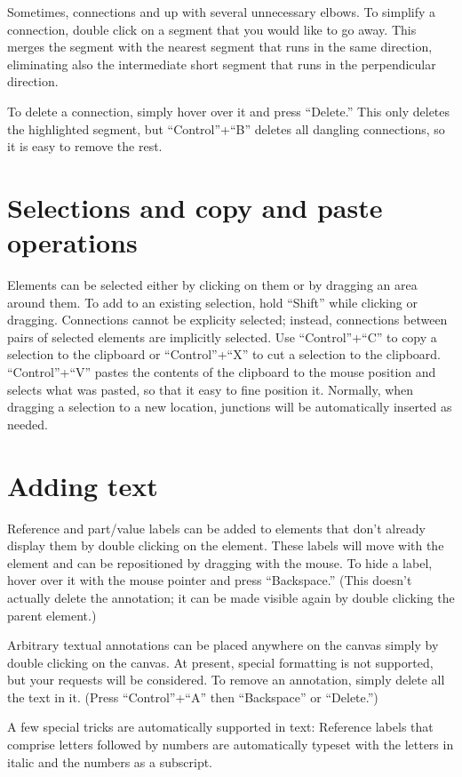 \documentclass[11pt]{report}
\begin{document}
Sometimes, connections and up with several unnecessary elbows. To
simplify a connection, double click on a segment that you would like
to go away. This merges the segment with the nearest segment that runs
in the same direction, eliminating also the intermediate short segment
that runs in the perpendicular direction.

To delete a connection, simply hover over it and press ``Delete.''
This only deletes the highlighted segment, but ``Control''+``B''
deletes all dangling connections, so it is easy to remove the rest.

\section{Selections and copy and paste operations}

Elements can be selected either by clicking on them or by dragging an
area around them. To add to an existing selection, hold ``Shift''
while clicking or dragging. Connections cannot be explicity selected;
instead, connections between pairs of selected elements are implicitly
selected. Use ``Control''+``C'' to copy a selection to the clipboard
or ``Control''+``X'' to cut a selection to the
clipboard. ``Control''+``V'' pastes the contents of the clipboard to
the mouse position and selects what was pasted, so that it easy to
fine position it. Normally, when dragging a selection to a new
location, junctions will be automatically inserted as needed.

\section{Adding text}

Reference and part/value labels can be added to elements that don't
already display them by double clicking on the element. These labels
will move with the element and can be repositioned by dragging with
the mouse. To hide a label, hover over it with the mouse pointer and
press ``Backspace.'' (This doesn't actually delete the annotation; it
can be made visible again by double clicking the parent element.)


Arbitrary textual annotations can be placed anywhere on the canvas
simply by double clicking on the canvas. At present, special
formatting is not supported, but your requests will be considered. To
remove an annotation, simply delete all the text in it. (Press
``Control''+``A'' then ``Backspace'' or ``Delete.'')

A few special tricks are automatically supported in text: Reference
labels that comprise letters followed by numbers are automatically
typeset with the letters in italic and the numbers as a subscript.
\end{document}
